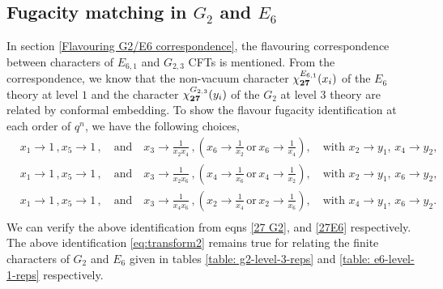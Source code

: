 \documentclass[a4paper,12pt]{article}
\begin{document}
\subsection{Fugacity matching in \ensuremath{G_2} and \ensuremath{E_6}}\label{discrete_flavours}
In section \ref{Flavouring G2/E6 correspondence}, the flavouring correspondence between characters of $E_{6,1}$ and $G_{2,3}$ CFTs is mentioned. From the correspondence, we know that the non-vacuum character $\chi_{\bf{27}}^{E_{6,1}}(x_i)$ of the $E_6$ theory at level $1$ and the character $\chi_{\bf{27}}^{G_{2,3}}(y_i)$ of the $G_2$ at level $3$ theory are related by conformal embedding. To show the flavour fugacity identification at each order of $q^n$, we have the following choices,
%
\begin{align}\label{eq:transform2}
 & x_1\to 1\,, x_5\to 1\,, \quad\text{and}\quad x_3\to \frac{1}{x_2 x_4}\,, \left(x_6\to \frac{1}{x_2}\,\text{or}\,x_6\to \frac{1}{x_4}\right), \quad \text{with  } x_2\to y_1,\, x_4\to y_2,\nonumber\\
  & x_1\to 1\,, x_5\to 1\, , \quad\text{and}\quad x_3\to \frac{1}{x_2 x_6}\,,\left( x_4\to \frac{1}{x_6}\,\text{or}\,x_4\to \frac{1}{x_2}\right),\quad \text{with  } x_2\to y_1,\, x_6\to y_2,\nonumber\\
 & x_1\to 1\,, x_5\to 1\,, \quad\text{and}\quad x_3\to \frac{1}{x_4 x_6}\,,\left( x_2\to \frac{1}{x_4}\,\text{or}\,x_2\to \frac{1}{x_6}\right),\quad \text{with  } x_4\to y_1,\, x_6\to y_2.\nonumber\\
\end{align}
%
We can verify the above identification from eqns \eqref{27 G2}, and \eqref{27E6} respectively. The above identification \eqref{eq:transform2} remains true for relating the finite characters of $G_2$ and $E_6$ given in tables \ref{table: g2-level-3-reps} and \ref{table: e6-level-1-reps} respectively.

 
\end{document}
